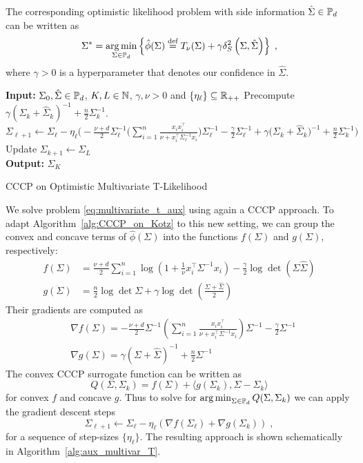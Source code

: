 \documentclass[sn-nature]{sn-jnl}%
\theoremstyle{thmstyleone}%
\theoremstyle{thmstyletwo}%
\theoremstyle{thmstylethree}%
\begin{document}
The corresponding optimistic likelihood problem with side  information $\hat{\Sigma}\in \mathbb{P}_d$ can be written as
\begin{equation}\label{eq:multivariate_t_aux}
    \Sigma^* = \operatorname*{arg\,min}_{\Sigma \in \mathbb{P}_d} \left\{ \hat{\phi}(\Sigma) \stackrel{\text{def}}{=}  T_\nu(\Sigma) + \gamma \delta_S^2 \left(\Sigma, \hat{\Sigma}\right) \right\} \; ,
\end{equation}
where $\gamma > 0$ is a hyperparameter that denotes our confidence in $\hat{\Sigma}$. 
%
\begin{algorithm}[t]
\small 
\SetAlgoLined
\textbf{Input:} $\Sigma_0, \hat{\Sigma} \in \mathbb{P}_d$, $K, L \in \mathbb{N}$, $\gamma, \nu > 0$ and $\{\eta_\ell\} \subseteq \mathbb{R}_{++}$
 \State Precompute $\gamma \left(\Sigma_k + \hat{\Sigma}_k\right)^{-1} + \frac{n}{2}\Sigma_k^{-1}$.
    \State $\Sigma_{\ell+1} \leftarrow  \Sigma_\ell - \eta_\ell \Big(- \frac{\nu + d}{2} \Sigma_\ell^{-1} \big(\sum_{i=1}^n \frac{x_i x_i^\top}{\nu + x_i^\top \Sigma_\ell^{-1} x_i} \big)\Sigma_\ell^{-1}  - \frac{\gamma}{2}\Sigma_\ell^{-1} +  \gamma \big(\Sigma_k + \hat{\Sigma}_k\big)^{-1} + \frac{n}{2}\Sigma^{-1}_k\Big) $
    \State Update $\Sigma_{k+1} \leftarrow \Sigma_{L}$\\
\textbf{Output:} $\Sigma_K$
\caption{CCCP on Optimistic Multivariate T-Likelihood}\label{alg:aux_multivar_T}
\end{algorithm}
%
We solve problem \eqref{eq:multivariate_t_aux} using again a CCCP approach. To adapt Algorithm~\ref{alg:CCCP_on_Kotz} to this new setting, we can group the convex and concave terms of $\hat{\phi}(\Sigma)$ into the functions $f(\Sigma)$ and $g(\Sigma)$, respectively:
\[
\begin{aligned}
    f(\Sigma) &= \frac{\nu + d}{2}\sum_{i=1}^n \log \left(1 + \frac{1}{\nu}x_i^\top \Sigma^{-1}x_i\right) - \frac{\gamma}{2}\log \det \left(\Sigma \hat{\Sigma}\right) \\
    g(\Sigma) &= \frac{n}{2}\log \det \Sigma + \gamma \log \det \left( \frac{\Sigma + \hat{\Sigma}}{2} \right)
\end{aligned}
\]
Their gradients are computed as 
\[
\begin{aligned}
&\nabla f(\Sigma) = - \frac{\nu + d}{2} \Sigma^{-1} \left(\sum_{i=1}^n \frac{x_i x_i^\top}{\nu + x_i^\top \Sigma^{-1} x_i} \right)\Sigma^{-1}  - \frac{\gamma}{2}\Sigma^{-1}
\\&\nabla g(\Sigma) = \gamma \left(\Sigma + \hat{\Sigma}\right)^{-1} + \frac{n}{2}\Sigma^{-1}
\end{aligned}
\]
The convex CCCP surrogate function can be written as $$Q(\Sigma, \Sigma_k) = f(\Sigma) + \langle g(\Sigma_k), \Sigma - \Sigma_k \rangle$$ for convex $f$ and concave $g$. Thus to solve for $\operatorname*{arg\,min}_{\Sigma \in \mathbb{P}_d} Q(\Sigma, \Sigma_k)$ we can apply the gradient descent steps 
\[
\Sigma_{\ell+1} \leftarrow \Sigma_{\ell} - \eta_\ell \left( \nabla f(\Sigma_\ell) + \nabla g\left(\Sigma_k\right)\right) \; ,
\]
for a sequence of step-sizes $\{\eta_\ell\}$. The resulting approach is shown schematically in Algorithm~\ref{alg:aux_multivar_T}.
\end{document}
